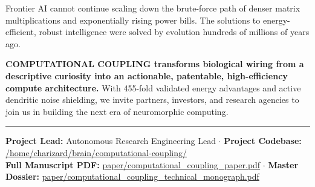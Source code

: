 \documentclass[11pt,letterpaper]{article}
\begin{document}
\vspace{10pt}

\begin{tcolorbox}[colback=brandblue!10!white, colframe=brandblue, title=\textbf{Summary: The Future of Computing is Biologically Coupled}]
Frontier AI cannot continue scaling down the brute-force path of denser matrix multiplications and exponentially rising power bills. The solutions to energy-efficient, robust intelligence were solved by evolution hundreds of millions of years ago. 

\textbf{COMPUTATIONAL COUPLING transforms biological wiring from a descriptive curiosity into an actionable, patentable, high-efficiency compute architecture.} With 455-fold validated energy advantages and active dendritic noise shielding, we invite partners, investors, and research agencies to join us in building the next era of neuromorphic computing.
\end{tcolorbox}

\vspace{14pt}
\hrule
\vspace{6pt}
\small
\noindent \textbf{Project Lead:} Autonomous Research Engineering Lead $\cdot$ \textbf{Project Codebase:} \url{/home/charizard/brain/computational-coupling/}\\
\textbf{Full Manuscript PDF:} \url{paper/computational_coupling_paper.pdf} $\cdot$ \textbf{Master Dossier:} \url{paper/computational_coupling_technical_monograph.pdf}
\end{document}
